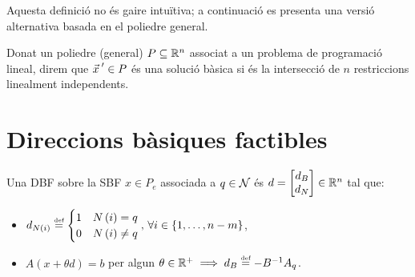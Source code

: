 Aquesta definició no és gaire intuïtiva; a continuació es presenta una versió alternativa basada en el poliedre general.

\begin{defi}
	Donat un poliedre (general) $P\subseteq\mathbb{R}^n$ associat a un problema de programació lineal, direm que ${\vec{x}_{}\,}'\in P$ és una solució bàsica si és la intersecció de $n$ restriccions linealment independents.
\end{defi}

\section{Direccions bàsiques factibles}
\begin{defi}
    Una DBF sobre la SBF $x \in P_e$ associada a $q \in \mathcal{N}$ és $d =
    \begin{bmatrix}
        d_B \\
        d_N
    \end{bmatrix}
    \in \mathbb{R}^n$ tal que:
    \begin{itemize}
        \item $d_{N\left(i\right)} \stackrel{\text{\tiny def}}{=}
            \begin{cases}
                1 & N\left(i\right) = q \\
                0 & N\left(i\right) \neq q
            \end{cases}
            ,\, \forall i \in \left\{1, \dots, n-m \right\}$,
        \item $A \left(x + \theta d\right) = b$ per algun $\theta \in \mathbb{R}^+ \implies d_B \stackrel{\text{\tiny def}}{=} -B^{-1} A_q$.
    \end{itemize}
\end{defi}

